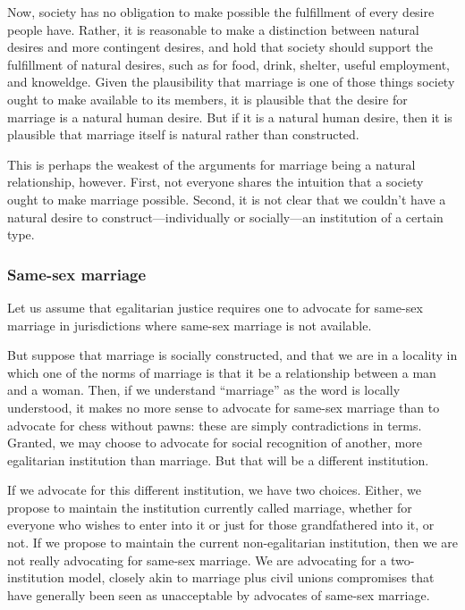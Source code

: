 Now, society has no obligation to make possible the fulfillment of every desire people have. Rather, it is reasonable to make a distinction between natural
desires and more contingent desires, and hold that society should support the fulfillment of natural desires, such as for food, drink, shelter, useful
employment, and knoweldge. Given the plausibility that marriage is one of those things society ought to make available to its members, it is plausible that
the desire for marriage is a natural human desire. But if it is a natural human desire, then it is plausible that marriage itself is natural rather than
constructed.

This is perhaps the weakest of the arguments for marriage being a natural relationship, however. First, not everyone shares the intuition that a society ought
to make marriage possible. Second, it is not clear that we couldn't have a natural desire to construct---individually or socially---an institution of a certain
type.

\subsubsection{Same-sex marriage}
Let us assume that egalitarian justice requires one to advocate for same-sex marriage in jurisdictions where same-sex marriage is not available.

But suppose that marriage is socially constructed, and that we are in a locality in which one of the norms of marriage is that it be a relationship
between a man and a woman. Then, if we understand ``marriage'' as the word is locally understood, it makes no more sense to advocate for same-sex marriage
than to advocate for chess without pawns: these are simply contradictions in terms. Granted, we may choose to advocate for social recognition of another,
more egalitarian institution than marriage. But that will be a different institution.

If we advocate for this different institution, we have two choices. Either, we propose to maintain the institution currently called marriage, whether for everyone
who wishes to enter into it or just for those grandfathered into it, or not. If we propose to maintain the current non-egalitarian institution, then we are not
really advocating for same-sex marriage. We are advocating for a two-institution model, closely akin to marriage plus civil unions compromises that have generally been
seen as unacceptable by advocates of same-sex marriage.


